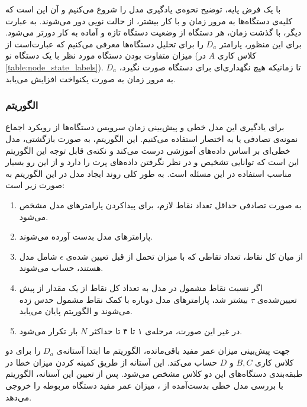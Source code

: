با یک فرض پایه، توضیح نحوه‌ی یادگیری مدل را شروع می‌کنیم و آن این است که کلیه‌ی دستگاه‌ها به مرور زمان و با کار بیشتر، از حالت نویی دور می‌شوند. به عبارت دیگر، با گذشت زمان، هر دستگاه از وضعیت دستگاه تازه و آماده به کار دورتر می‌شود. برای این منظور، پارامتر $D_a$ را برای تحلیل دستگاه‌ها معرفی می‌کنیم که عبارت‌است از میزان متفاوت بودن دستگاه مورد نظر با یک 
دستگاه نو (کلاس کاری $A$ در \cref{table:node_state_labels}). تا زمانیکه هیچ نگهداری‌ای برای دستگاه صورت نگیرد، $D_a$ به مرور زمان به صورت یکنواخت افزایش می‌یابد.

\subsubsection{الگوریتم }

برای یادگیری این مدل خطی و پیش‌بینی زمان سرویس دستگاه‌ها از رویکرد اجماع نمونه‌ی تصادفی یا به اختصار  استفاده می‌کنیم. این الگوریتم، به صورت بازگشتی، مدل خطی‌ای بر اساس داده‌های آموزشی درست می‌کند و نکته‌ی قابل توجه این الگوریتم این است که توانایی تشخیص و در نظر نگرفتن داده‌های پرت را دارد و از این رو بسیار مناسب استفاده در این مسئله است. به طور کلی روند ایجاد مدل در این الگوریتم به صورت زیر است\cite{derpanis2010overview}:

\begin{enumerate}

\item به صورت تصادفی حداقل تعداد نقاط لازم، برای پیداکردن پارامترهای مدل مشخص می‌شود.
\item پارامتر‌های مدل بدست آورده می‌شوند.
\item از میان کل نقاط، تعداد نقاطی که با میزان تحمل از قبل تعیین شده‌ی $\epsilon$ شامل مدل هستند، حساب می‌شوند.
\item اگر نسبت نقاط مشمول در مدل به تعداد کل نقاط از یک مقدار از پیش‌ تعیین‌شده‌ی $\tau$ بیشتر شد، پارامتر‌های مدل دوباره با کمک نقاط مشمول حدس زده می‌شوند و الگوریتم پایان می‌یابد.
\item در غیر این صورت، مرحله‌ی ۱ تا ۴ تا حداکثر $N$ بار تکرار می‌شود.

\end{enumerate}

جهت پیش‌بینی میزان عمر مفید باقی‌مانده، الگوریتم ما ابتدا آستانه‌ی $D_a$ را برای دو کلاس کاری $B, C$ و $D$ حساب می‌کند. این آستانه از طریق کمینه کردن میزان خطا در طبقه‌بندی دستگاه‌های این دو کلاس مشخص می‌شود. پس از تعیین این آستانه، الگوریتم با بررسی مدل خطی بدست‌آمده از ، میزان عمر مفید دستگاه مربوطه را خروجی‌ می‌دهد.

